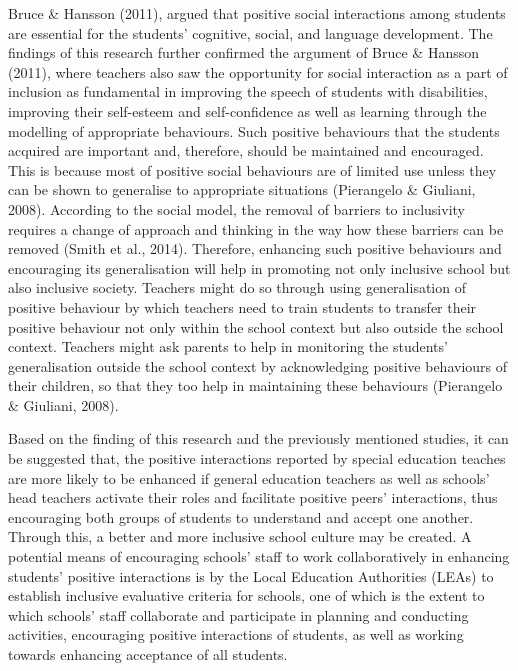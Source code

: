 \documentclass[11.5pt]{sig-alternate}
\begin{document}
\begin{large}
Bruce \& Hansson (2011), argued that positive social interactions among students are essential for the students’ cognitive, social, and language development. The findings of this research further confirmed the argument of Bruce \& Hansson (2011), where teachers also saw the opportunity for social interaction as a part of inclusion as fundamental in improving the speech of students with disabilities, improving their self-esteem and self-confidence as well as learning through the modelling of appropriate behaviours. Such positive behaviours that the students acquired are important and, therefore, should be maintained and encouraged. This is because most of positive social behaviours are of limited use unless they can be shown to generalise to appropriate situations (Pierangelo \& Giuliani, 2008).  According to the social model, the removal of barriers to inclusivity requires a change of approach and thinking in the way how these barriers can be removed (Smith et al., 2014). Therefore, enhancing such positive behaviours and encouraging its generalisation will help in promoting not only inclusive school but also inclusive society. Teachers might do so through using generalisation of positive behaviour by which teachers need to train students to transfer their positive behaviour not only within the school context but also outside the school context. Teachers might ask parents to help in monitoring the students’ generalisation outside the school context by acknowledging positive behaviours of their children, so that they too help in maintaining these behaviours (Pierangelo \& Giuliani, 2008).  

Based on the finding of this research and the previously mentioned studies, it can be suggested that, the positive interactions reported by special education teaches are more likely to be enhanced if general education teachers as well as schools’ head teachers activate their roles and facilitate positive peers’ interactions, thus encouraging both groups of students to understand and accept one another. Through this, a better and more inclusive school culture may be created. A potential means of encouraging schools’ staff to work collaboratively in enhancing students’ positive interactions is by the Local Education Authorities (LEAs) to establish inclusive evaluative criteria for schools, one of which is the extent to which schools’ staff collaborate and participate in planning and conducting activities, encouraging positive interactions of students, as well as working towards enhancing acceptance of all students.


\end{large}
\end{document}
